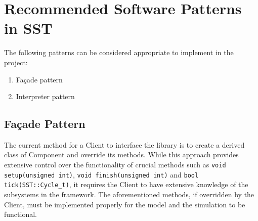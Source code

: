 \section{Recommended Software Patterns in SST}
The following patterns can be considered appropriate to implement in the project:
\begin{enumerate}
    \item Façade pattern
    \item Interpreter pattern
\end{enumerate}

\subsection{Façade Pattern}
The current method for a Client to interface the library is to create a derived class of Component and override its methods. While this approach provides extensive control over the functionality of crucial methods such as \texttt{void setup(unsigned int)}, \texttt{void finish(unsigned int)} and \texttt{bool tick(SST::Cycle\_t)}, it requires the Client to have extensive knowledge of the subsystems in the framework. The aforementioned methods, if overridden by the Client, must be implemented properly for the model and the simulation to be functional.

